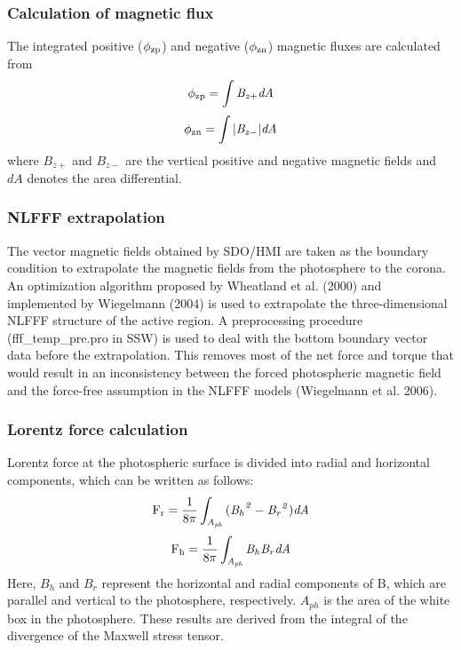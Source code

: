 \documentclass[12pt,preprint]{aastex}
\begin{document}
\begin{CJK*}{UTF8}{gbsn}
\subsubsection{Calculation of magnetic flux} 
The integrated positive ($\rm\phi_{zp}$) and negative ($\rm\phi_{zn}$) magnetic fluxes are calculated from
\begin{equation}\label{equation4}
\rm{\phi_{zp}}=\it\int B_{z+}dA
 \end{equation}
 \begin{equation}\label{equation5}
\rm{\phi_{zn}}=\it\int |B_{z-}|dA
 \end{equation}
where $B_{z+}$ and $B_{z-}$ are the vertical positive and negative magnetic fields and $dA$ denotes the area differential.\\

\subsubsection{NLFFF extrapolation} 
The vector magnetic fields obtained by SDO/HMI are taken as the boundary condition to extrapolate the magnetic fields from the photosphere to the corona. An optimization algorithm proposed by Wheatland et al. (2000) and implemented by Wiegelmann (2004) is used to extrapolate the three-dimensional NLFFF structure of the active region. A preprocessing procedure (fff\_temp\_pre.pro in SSW) is used to deal with the bottom boundary vector data before the extrapolation. This removes most of the net force and torque that would result in an inconsistency between the forced photospheric magnetic field and the force-free assumption in the NLFFF models (Wiegelmann et al. 2006).\\

\subsubsection{Lorentz force calculation} 
Lorentz force at the photospheric surface  is divided into radial and horizontal components, which can be written as follows:
\begin{equation}\label{equation4}
\rm{F_{r}}={1\over{8\pi}}\it\int_{A_{ph}} {(B_{h}}^{2}-{B_{r}}^{2})dA
\end{equation}
 \begin{equation}\label{equation5}
 \rm{F_{h}}={1\over{8\pi}}\it\int_{A_{ph}} B_{h}B_{r}dA
 \end{equation}
Here, $B_{h}$ and $B_{r}$ represent the horizontal  and radial components of B, which are parallel and vertical to the photosphere, respectively. $A_{ph}$ is the area of the white box in the photosphere. These results are derived from the integral of the divergence of the Maxwell stress tensor.


\end{CJK*}
\end{document}
